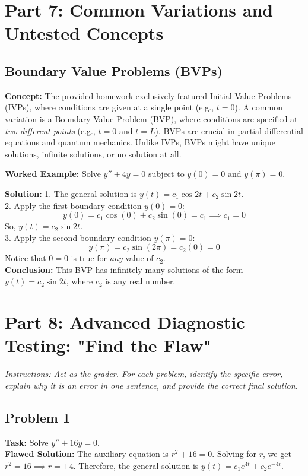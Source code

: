 \documentclass[11pt]{article}
\begin{document}
\newpage
\section{Part 7: Common Variations and Untested Concepts}

\subsection{Boundary Value Problems (BVPs)}
\textbf{Concept:} The provided homework exclusively featured Initial Value Problems (IVPs), where conditions are given at a single point (e.g., $t=0$). A common variation is a Boundary Value Problem (BVP), where conditions are specified at \textit{two different points} (e.g., $t=0$ and $t=L$). BVPs are crucial in partial differential equations and quantum mechanics. Unlike IVPs, BVPs might have unique solutions, infinite solutions, or no solution at all.

\textbf{Worked Example:}
Solve $y'' + 4y = 0$ subject to $y(0) = 0$ and $y(\pi) = 0$.

\textbf{Solution:}
1. The general solution is $y(t) = c_1 \cos 2t + c_2 \sin 2t$. \\
2. Apply the first boundary condition $y(0) = 0$:
\[ y(0) = c_1 \cos(0) + c_2 \sin(0) = c_1 \implies c_1 = 0 \]
So, $y(t) = c_2 \sin 2t$. \\
3. Apply the second boundary condition $y(\pi) = 0$:
\[ y(\pi) = c_2 \sin(2\pi) = c_2(0) = 0 \]
Notice that $0 = 0$ is true for \textit{any} value of $c_2$. \\
\textbf{Conclusion:} This BVP has infinitely many solutions of the form $y(t) = c_2 \sin 2t$, where $c_2$ is any real number.

\section{Part 8: Advanced Diagnostic Testing: "Find the Flaw"}
\textit{Instructions: Act as the grader. For each problem, identify the specific error, explain why it is an error in one sentence, and provide the correct final solution.}

\subsection*{Problem 1}
\textbf{Task:} Solve $y'' + 16y = 0$. \\
\textbf{Flawed Solution:} 
The auxiliary equation is $r^2 + 16 = 0$. 
Solving for $r$, we get $r^2 = 16 \implies r = \pm 4$. 
Therefore, the general solution is $y(t) = c_1 e^{4t} + c_2 e^{-4t}$.
\end{document}
